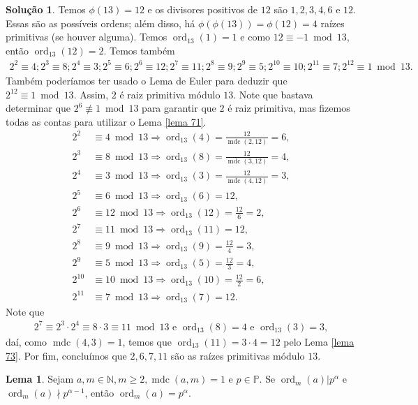 \documentclass[a4paper,11pt,twoside, leqno]{article}
\DeclareMathOperator{\mdc}{mdc}
\DeclareMathOperator{\Ord}{ord}
\theoremstyle{definition}
\newtheorem{lemma}[theorem]{Lema}
\newtheorem*{solution}{Solução}
\begin{document}
\begin{solution}
	Temos $\phi(13) = 12$ e os divisores positivos de $12$ são $1,2,3,4,6$ e $12$. Essas são as possíveis ordens; além disso, há $\phi(\phi(13)) = \phi(12) = 4$ raízes primitivas (se houver alguma). Temos $\Ord_{13}(1) = 1$ e como $12\equiv -1\bmod 13$, então $\Ord_{13}(12) = 2$. Temos também
	\begin{align*}
	2^2\equiv 4; 2^3\equiv 8; 2^4\equiv 3; 2^5\equiv 6; 2^6\equiv 12; 2^7\equiv 11; 2^8\equiv 9; 2^9\equiv 5; 2^{10}\equiv 10; 2^{11}\equiv 7; 2^{12}\equiv 1\bmod 13.
	\end{align*}
	Também poderíamos ter usado o Lema de Euler para deduzir que $2^{12}\equiv 1\bmod 13$. Assim, $2$ é raiz primitiva módulo $13$. Note que bastava determinar que $2^6\not\equiv 1\bmod 13$ para garantir que $2$ é raiz primitiva, mas fizemos todas as contas para utilizar o Lema \eqref{lema 71}.
	\begin{align*}
	2^2&\equiv 4\bmod 13 \Rightarrow \Ord_{13}(4) = \frac{12}{\mdc(2,12)} = 6, \\
	2^3&\equiv 8\bmod 13 \Rightarrow \Ord_{13}(8) = \frac{12}{\mdc(3,12)} = 4, \\
	2^4&\equiv 3\bmod 13 \Rightarrow \Ord_{13}(3) = \frac{12}{\mdc(4,12)} = 3, \\
	2^5&\equiv 6\bmod 13 \Rightarrow \Ord_{13}(6) = 12, \\
	2^6&\equiv 12\bmod 13 \Rightarrow \Ord_{13}(12) = \frac{12}{6} = 2, \\
	2^7&\equiv 11\bmod 13 \Rightarrow \Ord_{13}(11) = 12, \\
	2^8&\equiv 9\bmod 13 \Rightarrow \Ord_{13}(9) = \frac{12}{4} = 3, \\
	2^9&\equiv 5\bmod 13 \Rightarrow \Ord_{13}(5) = \frac{12}{3} = 4, \\
	2^{10}&\equiv 10\bmod 13 \Rightarrow \Ord_{13}(10) = \frac{12}{2} = 6, \\
	2^{11}&\equiv 7\bmod 13 \Rightarrow \Ord_{13}(7) = 12.
	\end{align*}
	Note que
	\begin{align*}
	2^7\equiv 2^3\cdot 2^4\equiv 8\cdot 3\equiv 11\bmod 13 \text{ e }\Ord_{13}(8) = 4 \text{ e } \Ord_{13}(3) = 3,
	\end{align*}
	daí, como $\mdc(4,3) = 1$, temos que $\Ord_{13}(11) = 3\cdot 4 = 12$ pelo Lema \eqref{lema 73}. Por fim, concluímos que $2,6,7,11$ são as raízes primitivas módulo $13$.
\end{solution}
\begin{lemma}
	\label{lema 74}
	Sejam $a,m\in\mathbb{N}, m\geq 2, \mdc(a,m)=1$ e $p\in\mathbb{P}$. Se $\Ord_m(a)|p^{\alpha}$ e $\Ord_m(a)\nmid p^{\alpha - 1}$, então $\Ord_m(a)=p^{\alpha}$.
\end{lemma}
\end{document}
